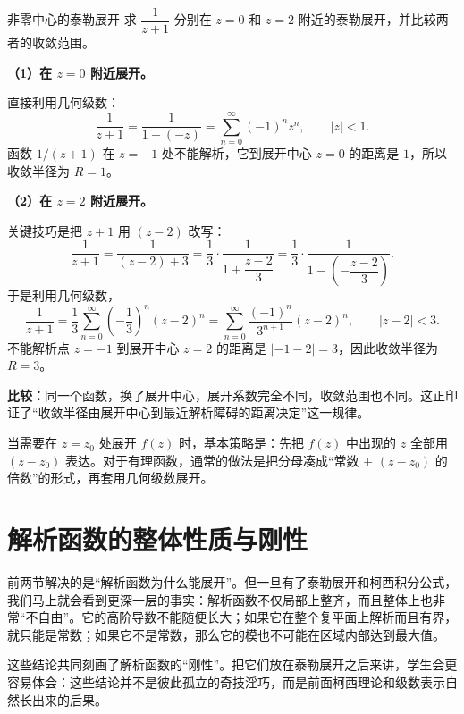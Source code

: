 \begin{lizi}{非零中心的泰勒展开}{}
求 $\dfrac{1}{z+1}$ 分别在 $z=0$ 和 $z=2$ 附近的泰勒展开，并比较两者的收敛范围。

\begin{jie}
\textbf{（1）在 $z=0$ 附近展开。}

直接利用几何级数：
\[
    \frac{1}{z+1} = \frac{1}{1-(-z)} = \sum_{n=0}^{\infty} (-1)^n z^n, \qquad |z|<1.
\]
函数 $1/(z+1)$ 在 $z=-1$ 处不能解析，它到展开中心 $z=0$ 的距离是 $1$，所以收敛半径为 $R=1$。

\textbf{（2）在 $z=2$ 附近展开。}

关键技巧是把 $z+1$ 用 $(z-2)$ 改写：
\[
    \frac{1}{z+1} = \frac{1}{(z-2)+3} = \frac{1}{3}\cdot\frac{1}{1+\dfrac{z-2}{3}} = \frac{1}{3}\cdot\frac{1}{1-\left(-\dfrac{z-2}{3}\right)}.
\]
于是利用几何级数，
\[
    \frac{1}{z+1} = \frac{1}{3}\sum_{n=0}^{\infty} \left(-\frac{1}{3}\right)^n (z-2)^n = \sum_{n=0}^{\infty} \frac{(-1)^n}{3^{n+1}} (z-2)^n, \qquad |z-2|<3.
\]
不能解析点 $z=-1$ 到展开中心 $z=2$ 的距离是 $|{-1}-2|=3$，因此收敛半径为 $R=3$。

\textbf{比较：}同一个函数，换了展开中心，展开系数完全不同，收敛范围也不同。这正印证了``收敛半径由展开中心到最近解析障碍的距离决定''这一规律。
\end{jie}
\end{lizi}

\begin{tishi}[非零中心展开的通用技巧]
当需要在 $z=z_0$ 处展开 $f(z)$ 时，基本策略是：先把 $f(z)$ 中出现的 $z$ 全部用 $(z-z_0)$ 表达。对于有理函数，通常的做法是把分母凑成``常数 $\pm$ $(z-z_0)$ 的倍数''的形式，再套用几何级数展开。
\end{tishi}

\section{解析函数的整体性质与刚性}

\begin{wulibj}[为什么在这里插入这一节]
前两节解决的是``解析函数为什么能展开''。但一旦有了泰勒展开和柯西积分公式，我们马上就会看到更深一层的事实：解析函数不仅局部上整齐，而且整体上也非常``不自由''。它的高阶导数不能随便长大；如果它在整个复平面上解析而且有界，就只能是常数；如果它不是常数，那么它的模也不可能在区域内部达到最大值。

这些结论共同刻画了解析函数的``刚性''。把它们放在泰勒展开之后来讲，学生会更容易体会：这些结论并不是彼此孤立的奇技淫巧，而是前面柯西理论和级数表示自然长出来的后果。
\end{wulibj}

